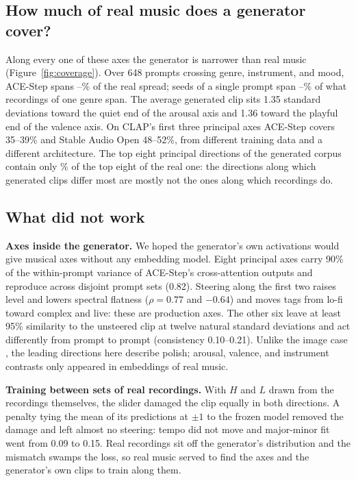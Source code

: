 \subsection{How much of real music does a generator cover?}

Along every one of these axes the generator is narrower than real music (Figure~\ref{fig:coverage}). Over 648 prompts crossing genre, instrument, and mood, ACE-Step spans \covLo{}--\covHi{}\% of the real spread; seeds of a single prompt span \covSeedLo{}--\covSeedHi{}\% of what recordings of one genre span. The average generated clip sits 1.35 standard deviations toward the quiet end of the arousal axis and 1.36 toward the playful end of the valence axis. On CLAP's first three principal axes ACE-Step covers 35--39\% and Stable Audio Open 48--52\%, from different training data and a different architecture. The top eight principal directions of the generated corpus contain only \covOverlap{}\% of the top eight of the real one: the directions along which generated clips differ most are mostly not the ones along which recordings do.


\subsection{What did not work}

\textbf{Axes inside the generator.} We hoped the generator's own activations would give musical axes without any embedding model. Eight principal axes carry 90\% of the within-prompt variance of ACE-Step's cross-attention outputs and reproduce across disjoint prompt sets (0.82). Steering along the first two raises level and lowers spectral flatness ($\rho=0.77$ and $-0.64$) and moves tags from lo-fi toward complex and live: these are production axes. The other six leave at least 95\% similarity to the unsteered clip at twelve natural standard deviations and act differently from prompt to prompt (consistency 0.10--0.21). Unlike the image case \citep{haas2024directions}, the leading directions here describe polish; arousal, valence, and instrument contrasts only appeared in embeddings of real music.

\textbf{Training between sets of real recordings.} With $H$ and $L$ drawn from the recordings themselves, the slider damaged the clip equally in both directions. A penalty tying the mean of its predictions at $\pm1$ to the frozen model removed the damage and left almost no steering: tempo did not move and major-minor fit went from 0.09 to 0.15. Real recordings sit off the generator's distribution and the mismatch swamps the loss, so real music served to find the axes and the generator's own clips to train along them.
